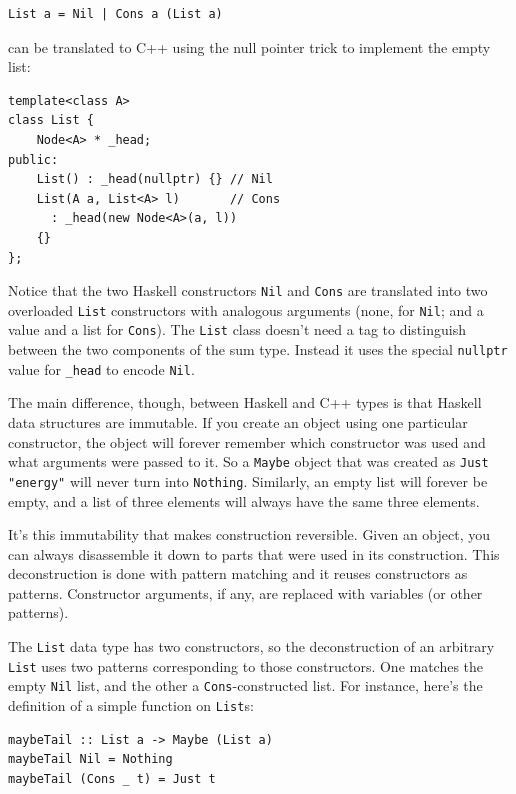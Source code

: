 \begin{verbatim}
List a = Nil | Cons a (List a)
\end{verbatim}

\noindent
can be translated to C++ using the null pointer trick to implement the
empty list:

\begin{verbatim}
template<class A>
class List { 
    Node<A> * _head;
public:
    List() : _head(nullptr) {} // Nil
    List(A a, List<A> l)       // Cons
      : _head(new Node<A>(a, l))
    {}
};
\end{verbatim}

\noindent
Notice that the two Haskell constructors \texttt{Nil} and \texttt{Cons}
are translated into two overloaded \texttt{List} constructors with
analogous arguments (none, for \texttt{Nil}; and a value and a list for
\texttt{Cons}). The \texttt{List} class doesn't need a tag to
distinguish between the two components of the sum type. Instead it uses
the special \texttt{nullptr} value for \texttt{\_head} to encode
\texttt{Nil}.

The main difference, though, between Haskell and C++ types is that
Haskell data structures are immutable. If you create an object using one
particular constructor, the object will forever remember which
constructor was used and what arguments were passed to it. So a
\texttt{Maybe} object that was created as \texttt{Just "energy"} will
never turn into \texttt{Nothing}. Similarly, an empty list will forever
be empty, and a list of three elements will always have the same three
elements.

It's this immutability that makes construction reversible. Given an
object, you can always disassemble it down to parts that were used in
its construction. This deconstruction is done with pattern matching and
it reuses constructors as patterns. Constructor arguments, if any, are
replaced with variables (or other patterns).

The \texttt{List} data type has two constructors, so the deconstruction
of an arbitrary \texttt{List} uses two patterns corresponding to those
constructors. One matches the empty \texttt{Nil} list, and the other a
\texttt{Cons}-constructed list. For instance, here's the definition of a
simple function on \texttt{List}s:

\begin{verbatim}
maybeTail :: List a -> Maybe (List a)
maybeTail Nil = Nothing
maybeTail (Cons _ t) = Just t
\end{verbatim}

